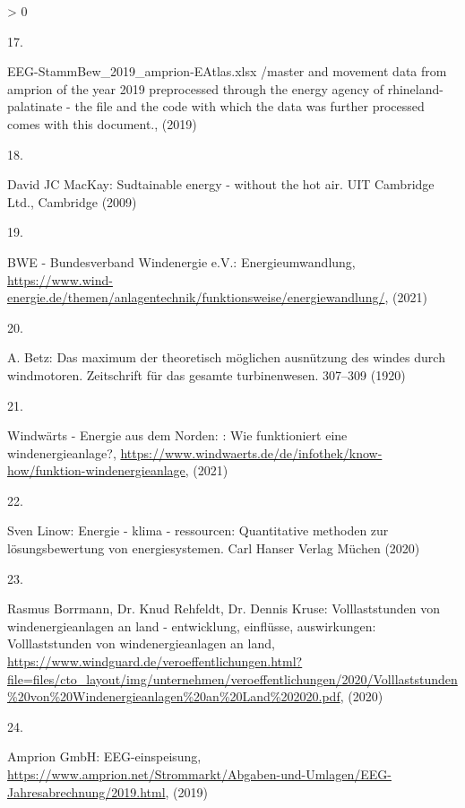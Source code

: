 \documentclass[a4paper,11pt]{article}
\newlength{\cslhangindent}
\newlength{\csllabelwidth}
\newenvironment{CSLReferences}[3] %
 {%
  \setlength{\parindent}{0pt}
  \ifodd #1 \everypar{\setlength{\hangindent}{\cslhangindent}}\ignorespaces\fi
  \ifnum #2 > 0
  \setlength{\parskip}{#2\baselineskip}
  \fi
 }%
 {}
\newcommand{\CSLLeftMargin}[1]{\parbox[t]{\maxof{\widthof{#1}}{\csllabelwidth}}{#1}}
\newcommand{\CSLRightInline}[1]{\parbox[t]{\linewidth}{#1}}
\begin{document}
\begin{CSLReferences}{0}{0}
\leavevmode\hypertarget{ref-EnergieagenturRheinlandPfalz.2019}{}%
\CSLLeftMargin{17. }
\CSLRightInline{EEG-StammBew{\_}2019{\_}amprion-EAtlas.xlsx /master and movement data from amprion of the year 2019 preprocessed through the energy agency of rhineland-palatinate - the file and the code with which the data was further processed comes with this document., (2019)}

\leavevmode\hypertarget{ref-DavidJCMacKay.2009}{}%
\CSLLeftMargin{18. }
\CSLRightInline{David JC MacKay: Sudtainable energy - without the hot air. {UIT Cambridge Ltd.}, Cambridge (2009)}

\leavevmode\hypertarget{ref-BWE.2021}{}%
\CSLLeftMargin{19. }
\CSLRightInline{BWE - Bundesverband Windenergie e.V.: Energieumwandlung, \url{https://www.wind-energie.de/themen/anlagentechnik/funktionsweise/energiewandlung/}, (2021)}

\leavevmode\hypertarget{ref-A.Betz.1920}{}%
\CSLLeftMargin{20. }
\CSLRightInline{A. Betz: Das maximum der theoretisch m{ö}glichen ausn{ü}tzung des windes durch windmotoren. Zeitschrift f{ü}r das gesamte turbinenwesen. 307--309 (1920)}

\leavevmode\hypertarget{ref-WindwartsEnergieausdemNorden.2021}{}%
\CSLLeftMargin{21. }
\CSLRightInline{Windwärts - Energie aus dem Norden: : Wie funktioniert eine windenergieanlage?, \url{https://www.windwaerts.de/de/infothek/know-how/funktion-windenergieanlage}, (2021)}

\leavevmode\hypertarget{ref-SvenLinow.2020}{}%
\CSLLeftMargin{22. }
\CSLRightInline{Sven Linow: Energie - klima - ressourcen: Quantitative methoden zur l{ö}sungsbewertung von energiesystemen. {Carl Hanser Verlag M{ü}chen} (2020)}

\leavevmode\hypertarget{ref-RasmusBorrmannDr.KnudRehfeldtDr.DennisKruse.2020}{}%
\CSLLeftMargin{23. }
\CSLRightInline{Rasmus Borrmann, Dr. Knud Rehfeldt, Dr. Dennis Kruse: Volllaststunden von windenergieanlagen an land - entwicklung, einfl{ü}sse, auswirkungen: Volllaststunden von windenergieanlagen an land, \url{https://www.windguard.de/veroeffentlichungen.html?file=files/cto_layout/img/unternehmen/veroeffentlichungen/2020/Volllaststunden\%20von\%20Windenergieanlagen\%20an\%20Land\%202020.pdf}, (2020)}

\leavevmode\hypertarget{ref-AmprionGmbH.2019}{}%
\CSLLeftMargin{24. }
\CSLRightInline{Amprion GmbH: EEG-einspeisung, \url{https://www.amprion.net/Strommarkt/Abgaben-und-Umlagen/EEG-Jahresabrechnung/2019.html}, (2019)}

\end{CSLReferences}
\indent
\setlength{\parindent}{17pt}
\setlength{\leftskip}{0pt}
\setlength{\parskip}{0pt}
\end{document}
